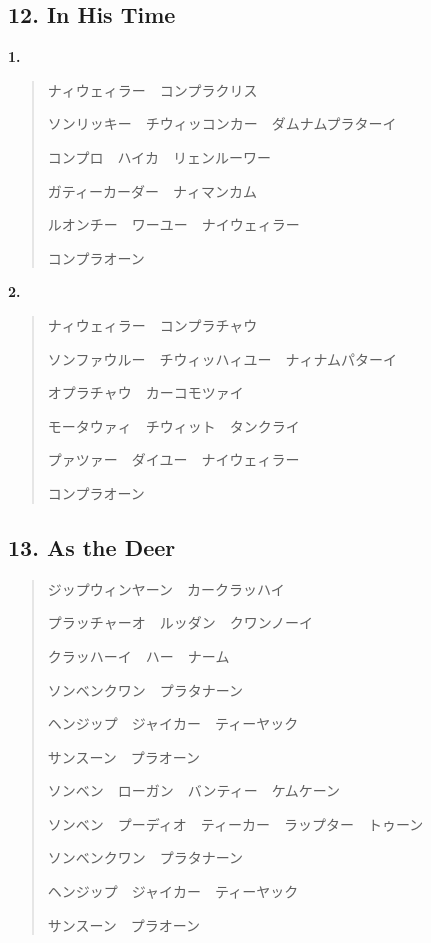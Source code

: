 \documentclass[a4paper, twocolumn]{article}
\begin{document}
\subsection*{12. In His Time}

{\bf 1. } \vspace*{-5mm}
\begin{quote}
ナィウェィラー　コンプラクリス\par
ソンリッキー　チウィッコンカー　ダムナムプラターイ\par
コンプロ　ハイカ　リェンルーワー\par
ガティーカーダー　ナィマンカム\par
ルオンチー　ワーユー　ナイウェィラー\par
コンプラオーン
\end{quote}

\noindent
{\bf 2. }\vspace*{-5mm}
\begin{quote}
ナィウェィラー　コンプラチャウ\par
ソンファウルー　チウィッハィユー　ナィナムパターイ\par
オプラチャウ　カーコモツァイ\par
モータウァィ　チウィット　タンクライ\par
プァツァー　ダイユー　ナイウェィラー\par
コンプラオーン
\end{quote}

\subsection*{13. As the Deer}

\begin{quote}
ジップウィンヤーン　カークラッハイ\par
プラッチャーオ　ルッダン　クワンノーイ\par
クラッハーイ　ハー　ナーム

\smallskip
ソンベンクワン　プラタナーン\par
ヘンジップ　ジャイカー　ティーヤック\par
サンスーン　プラオーン

\smallskip
ソンベン　ローガン　バンティー　ケムケーン\par
ソンベン　プーディオ　ティーカー　ラップター　トゥーン\par

\smallskip
ソンベンクワン　プラタナーン\par
ヘンジップ　ジャイカー　ティーヤック\par
サンスーン　プラオーン
\end{quote}
\end{document}
